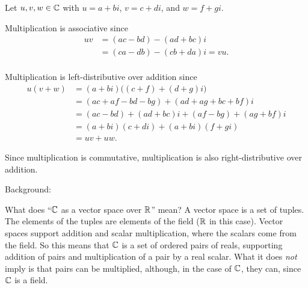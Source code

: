 \documentclass[12pt]{article}
\begin{document}
\begin{description}



  Let $u, v, w \in \mathbb{C}$ with $u = a + bi$, $v = c + di$, and $w = f + gi$.

  Multiplication is associative since
  \begin{align*}
    uv &= (ac - bd) - (ad + bc)i \\
       &= (ca - db) - (cb + da)i = vu. \\
  \end{align*}

  Multiplication is left-distributive over addition since
  \begin{align*}
    u(v + w)
    &= (a + bi)\big((c + f) + (d + g)i\big) \\
    &= (ac + af - bd - bg) + (ad + ag + bc + bf)i \\
    &= (ac - bd) + (ad + bc)i + (af - bg) + (ag + bf)i \\
    &= (a + bi)(c + di) + (a + bi)(f + gi) \\
    &=uv + uw.
  \end{align*}

  Since multiplication is commutative, multiplication is also right-distributive over addition.



  Background:

  What does ``$\mathbb{C}$ as a vector space over $\mathbb{R}$'' mean? A vector space is a set of
  tuples. The elements of the tuples are elements of the field ($\mathbb{R}$ in this
  case). Vector spaces support addition and scalar multiplication, where the
  scalars come from the field. So this means that $\mathbb{C}$ is a set of ordered pairs
  of reals, supporting addition of pairs and multiplication of a pair by a real
  scalar. What it does \textit{not} imply is that pairs can be multiplied,
  although, in the case of $\mathbb{C}$, they can, since $\mathbb{C}$ is a field.


\end{description}
\end{document}
